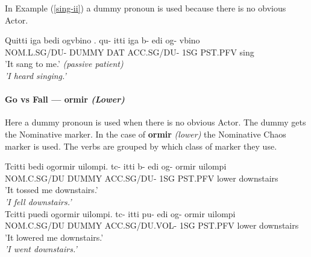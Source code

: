 \documentclass[11pt]{article}
\newcommand{\exref}[1]{(\ref{#1})}
\begin{document}
\begin{minipage}{\linewidth}
In Example \exref{sing-ii} a dummy pronoun is used because there is no obvious Actor.

\begin{exe}
  \ex \label{sing-ii}
  \begin{xlist}
\ex \label{sing-ii:typei}
Quitti iga bedi ogvbino .
\gll
qu-          itti  iga b-         edi og-     vbino \\
NOM.L.SG/DU- DUMMY DAT ACC.SG/DU- 1SG PST.PFV sing \\
\trans 
    {\textthin{}'It sang to me.' \textit{(passive patient)}}\\
    \textit{'I heard singing.'}
  \end{xlist}
\end{exe}
\end{minipage}

\paragraph{Go vs Fall — ormir \textit{(Lower)}}
Here a dummy pronoun is used when there is no obvious Actor.
The dummy gets the Nominative marker.
In the case of \textbf{ormir} \textit{(lower)} the Nominative Chaos marker is used.
The verbs are grouped by which class of marker they use.

\begin{exe}
\ex \label{fall}
\begin{xlist}

\ex \label{fall:invol}
Tcitti bedi ogormir uilompi.
\gll
tc-         itti  b-         edi og-     ormir uilompi\\
NOM.C.SG/DU DUMMY ACC.SG/DU- 1SG PST.PFV lower  downstairs\\
\trans 
    {\textthin{}'It tossed me downstairs.'}\\
    \textit{'I fell downstairs.'}\\

\ex \label{fall:vol}
Tcitti puedi ogormir uilompi.
\gll
tc-       itti  pu-            edi og-     ormir    uilompi\\
NOM.C.SG/DU DUMMY ACC.SG/DU.VOL- 1SG PST.PFV lower downstairs\\
\trans 
    {\textthin{}'It lowered me downstairs.'}\\
    \textit{'I went downstairs.'}\\
\end{xlist}
\end{exe}
\end{document}
